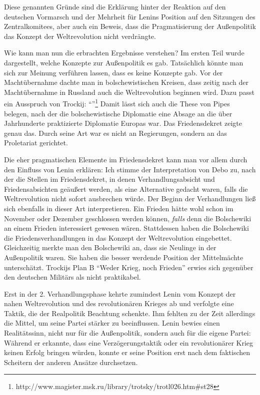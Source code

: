 \documentclass{../../sem_paper}
\begin{document}
Diese genannten Gründe sind die Erklärung hinter der Reaktion auf den deutschen Vormarsch und der Mehrheit für Lenins Position auf den Sitzungen des Zentralkomitees, aber auch ein Beweis, dass die Pragmatisierung der Außenpolitik das Konzept der Weltrevolution nicht verdrängte.

\newpage
{}
Wie kann man nun die erbrachten Ergebnisse verstehen? Im ersten Teil wurde dargestellt, welche Konzepte zur Außenpolitik es gab. Tatsächlich könnte man sich zur Meinung verführen lassen, dass es keine Konzepte gab. Vor der Machtübernahme dachte man in bolschewistischen Kreisen, dass zeitig nach der Machtübernahme in Russland auch die Weltrevolution beginnen wird. Dazu passt ein Ausspruch von Trockij: "`"'\footnote{http://www.magister.msk.ru/library/trotsky/trotl026.htm\#st28}
Damit lässt sich auch die These\autocite[389]{pipes1992} von Pipes belegen, nach der die bolschewistische Diplomatie eine Absage an die über Jahrhunderte praktizierte Diplomatie Europas war. Das Friedensdekret zeigte genau das. Durch seine Art war es nicht an Regierungen, sondern an das Proletariat gerichtet.

Die eher pragmatischen Elemente im Friedensdekret kann man vor allem durch den Einfluss von Lenin erklären:
Ich stimme der Interpretation\autocite[18]{debo1979} von Debo zu, nach der die Stellen im Friedensdekret, in denen Verhandlungsabsicht und Friedensabsichten geäußert werden, als eine Alternative gedacht waren, falls die Weltrevolution nicht sofort ausbrechen würde.
Der Beginn der Verhandlungen ließ sich ebenfalls in dieser Art interpretieren. Ein Frieden hätte wohl schon im November oder Dezember geschlossen werden können, \textit{falls} denn die Bolschewiki an einem Frieden interessiert gewesen wären. Stattdessen haben die Bolschewiki die Friedensverhandlungen in das Konzept der Weltrevolution eingebettet. Gleichzeitig merkte man den Bolschewiki an, dass sie Neulinge in der Außenpolitik waren. Sie haben die besser werdende Position der Mittelmächte unterschätzt. Trockijs Plan B "`Weder Krieg, noch Frieden"' erwies sich gegenüber den deutschen Militärs als nicht praktikabel.

Erst in der 2. Verhandlungsphase kehrte zumindest Lenin vom Konzept der nahen Weltrevolution und des revolutionären Krieges ab und verfolgte eine Taktik, die der Realpolitik Beachtung schenkte. Ihm fehlten zu der Zeit allerdings die Mittel, um seine Partei stärker zu beeinflussen. Lenin bewies einen Realitätssinn, nicht nur für die Außenpolitik, sondern auch für die eigene Partei: Während er erkannte, dass eine Verzögerungstaktik oder ein revolutionärer Krieg keinen Erfolg bringen würden, konnte er seine Position erst nach dem faktischen Scheitern der anderen  Ansätze durchsetzen. 
\end{document}
